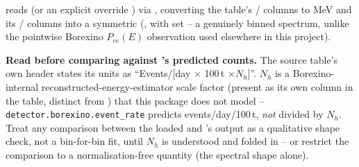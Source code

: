 \begin{implbox}
reads 
(or an explicit override ) via , converting
the table's / columns to MeV and its
/ columns into a symmetric
 (, with
 set -- a genuinely binned spectrum, unlike the
pointwise Borexino $P_{ee}(E)$ observation used elsewhere in this project).
\end{implbox}

\begin{notebox}
\textbf{Read before comparing against 's
predicted counts.} The source table's own header states its units as
``Events/[day $\times$ 100\,t $\times N_h$]''. $N_h$ is a
Borexino-internal reconstructed-energy-estimator scale factor (present as
its own column in the table, distinct from ) that this
package does not model -- \texttt{detector.borexino.event\_rate} predicts
events/day/100\,t, \emph{not} divided by $N_h$. Treat any comparison between
the loaded  and 's output as a
qualitative shape check, not a bin-for-bin fit, until $N_h$ is understood and
folded in -- or restrict the comparison to a normalisation-free quantity
(the spectral shape alone).
\end{notebox}
